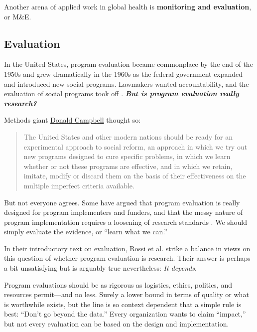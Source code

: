 \documentclass[justified,twoside,symmetric,]{tufte-book}
\renewcommand*{\citep}[1]{{\cite{#1}}}
\let\subsubsection\subsection
\begin{document}
Another arena of applied work in global health is \textbf{monitoring and evaluation}, or M\&E.

\hypertarget{evaluation}{%
\subsubsection*{Evaluation}\label{evaluation}}

In the United States, program evaluation became commonplace by the end of the 1950s and grew dramatically in the 1960s as the federal government expanded and introduced new social programs. Lawmakers wanted accountability, and the evaluation of social programs took off \citep{rossi:2003}. \textbf{\emph{But is program evaluation really research?}}

Methods giant \href{https://en.wikipedia.org/wiki/Donald_T._Campbell}{Donald Campbell} thought so:\citep{campbell:1969}

\begin{quote}
The United States and other modern nations should be ready for an experimental approach to social reform, an approach in which we try out new programs designed to cure specific problems, in which we learn whether or not these programs are effective, and in which we retain, imitate, modify or discard them on the basis of their effectiveness on the multiple imperfect criteria available.
\end{quote}

But not everyone agrees. Some have argued that program evaluation is really designed for program implementers and funders, and that the messy nature of program implementation requires a loosening of research standards \citep{cronbach:1982}. We should simply evaluate the evidence, or ``learn what we can.''

In their introductory text on evaluation, Rossi et al. \citeyearpar{rossi:2003} strike a balance in views on this question of whether program evaluation is research. Their answer is perhaps a bit unsatisfying but is arguably true nevertheless: \emph{It depends}.

Program evaluations should be as rigorous as logistics, ethics, politics, and resources permit---and no less. Surely a lower bound in terms of quality or what is worthwhile exists, but the line is so context dependent that a simple rule is best: ``Don't go beyond the data.'' Every organization wants to claim ``impact,'' but not every evaluation can be based on the design and implementation.
\end{document}

